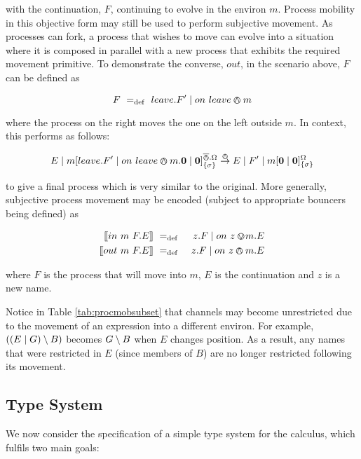 \documentclass[orivec,envcountsame]{llncs}
\begin{document}
\noindent with the continuation, $F$, continuing to evolve in the
environ $m$.  Process mobility in this objective form may still be used
to perform subjective movement.  As processes can fork, a process that
wishes to move can evolve into a situation where it is composed in
parallel with a new process that exhibits the required movement
primitive.  To demonstrate the converse, $out$, in the scenario
above, $F$ can be defined as

\begin{equation}
F \mathrel{~=_\mathrm{def}~} leave.F^\prime \mid on\ leave \varowedge m
\end{equation}

\noindent where the process on the right moves the one on the left
outside $m$.  In context, this performs as follows:

\begin{equation}
E \mid {m}[ leave.F^\prime \mid on\ leave \varowedge m.\textbf{0} \mid
 \textbf{0} ]^{\overline{\varowedge}.\Omega}_{\{\sigma\}} 
\stackrel{\varowedge}{\rightarrow}
E \mid F^\prime \mid {m}[ \textbf{0} \mid \textbf{0} ]^{\Omega}_{\{\sigma\}}
\end{equation}

\noindent to give a final process which is very similar to the original.
More generally, subjective process movement may be encoded (subject to
appropriate bouncers being defined) as

\begin{eqnarray*}
\seml in\ m\ F.E \semr & \eqdef & z.F \pc \procin{z}{m}.E \\
\seml out\ m\ F.E \semr & \eqdef & z.F \pc \procout{z}{m}.E
\end{eqnarray*}

\noindent where $F$ is the process that will move into $m$, $E$ is the
continuation and $z$ is a new name. 

Notice in Table \ref{tab:procmobsubset} that channels may become
unrestricted due to the movement of an expression into a different
environ.  For example, $((E \mid G) \setminus {B})$ becomes $G \setminus {B}$ when
$E$ changes position.  As a result, any names that were restricted in
$E$ (since members of $B$) are no longer restricted following its
movement.

\subsection{Type System}
\label{typesys}

We now consider the specification of a simple type system for the
calculus, which fulfils two main goals:
\end{document}
